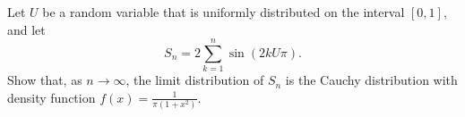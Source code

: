 Let $U$ be a random variable that is uniformly distributed on the interval $[0,1]$, and let
\[S_n= 2\sum_{k=1}^n \sin(2kU\pi).\]
Show that, as $n\to \infty$, the limit distribution of $S_n$ is the Cauchy distribution with density function $f(x)=\frac1{\pi(1+x^2)}$.
